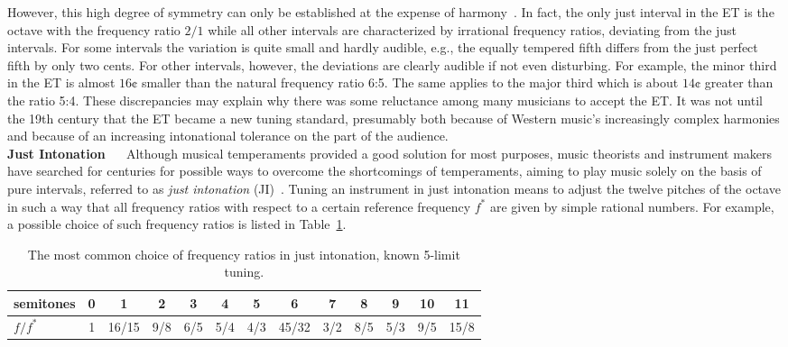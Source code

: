 However, this high degree of symmetry can only be established at the expense of harmony~\cite{DuffinBook}. In fact, the only just interval in the ET is the octave with the frequency ratio $2/1$ while all other intervals are characterized by irrational frequency ratios, deviating from the just intervals. For some intervals the variation is quite small and hardly audible, e.g., the equally tempered fifth differs from the just perfect fifth by only two cents. For other intervals, however, the deviations are clearly audible if not even disturbing. For example, the minor third in the ET is almost $16\cent$ smaller than the natural frequency ratio 6:5. The same applies to the major third which is about $14\cent$ greater than the ratio 5:4. These discrepancies may explain why there was some reluctance among many musicians to accept the ET. It was not until the 19th century that the ET became a new tuning standard, presumably both because of Western music's increasingly complex harmonies and because of an increasing intonational tolerance on the part of the audience.\\

\noindent\textbf{Just Intonation}
~\newline~\newline
Although musical temperaments provided a good solution for most purposes, music theorists and instrument makers have searched for centuries for possible ways to overcome the shortcomings of temperaments, aiming to play music solely on the basis of pure intervals, referred to as \textit{just intonation} (JI)~\cite{DuffinArticle}. Tuning an instrument in just intonation means to adjust the twelve pitches of the octave in such a way that all frequency ratios with respect to a certain reference frequency $f^*$ are given by simple rational numbers. For example, a possible choice of such frequency ratios is listed in Table~\ref{tab:frequencyratios}.

\begin{table}
\begin{center}
\begin{tabular}{l|cccccccccccc}
semitones& 0 & 1 & 2 & 3 & 4 & 5 & 6 & 7 & 8 & 9 & 10 & 11\\ \hline
$f/f^*$ & 1 & 16/15 & 9/8 & 6/5 & 5/4 & 4/3 & 45/32 & 3/2 & 8/5 & 5/3 & 9/5 & 15/8 
\end{tabular}
\end{center}
\caption{The most common choice of frequency ratios in just intonation, known 5-limit tuning. }
\label{tab:frequencyratios}
\end{table}

